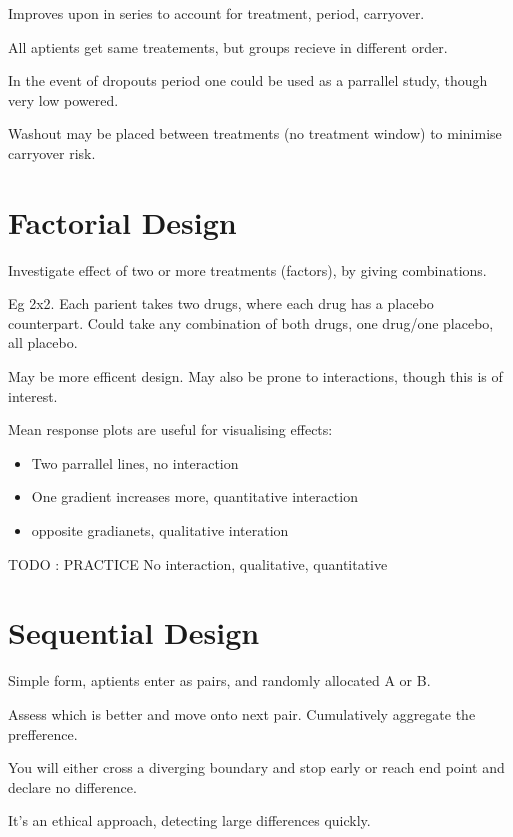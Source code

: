 \documentclass[
  letterpaper,
  DIV=11,
  numbers=noendperiod]{scrreprt}
\providecommand{\tightlist}{%
  \setlength{\itemsep}{0pt}\setlength{\parskip}{0pt}}\usepackage{longtable,booktabs,array}
\begin{document}
Improves upon in series to account for treatment, period, carryover.

All aptients get same treatements, but groups recieve in different
order.

In the event of dropouts period one could be used as a parrallel study,
though very low powered.

Washout may be placed between treatments (no treatment window) to
minimise carryover risk.

\hypertarget{factorial-design}{%
\section{Factorial Design}\label{factorial-design}}

Investigate effect of two or more treatments (factors), by giving
combinations.

Eg 2x2. Each parient takes two drugs, where each drug has a placebo
counterpart. Could take any combination of both drugs, one drug/one
placebo, all placebo.

May be more efficent design. May also be prone to interactions, though
this is of interest.

Mean response plots are useful for visualising effects:

\begin{itemize}
\tightlist
\item
  Two parrallel lines, no interaction
\item
  One gradient increases more, quantitative interaction
\item
  opposite gradianets, qualitative interation
\end{itemize}

TODO : PRACTICE No interaction, qualitative, quantitative

\hypertarget{sequential-design}{%
\section{Sequential Design}\label{sequential-design}}

Simple form, aptients enter as pairs, and randomly allocated A or B.

Assess which is better and move onto next pair. Cumulatively aggregate
the prefference.

You will either cross a diverging boundary and stop early or reach end
point and declare no difference.

It's an ethical approach, detecting large differences quickly.
\end{document}
